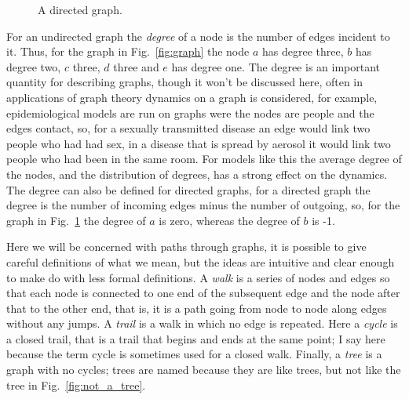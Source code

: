 \documentclass[11pt,a4paper]{scrartcl}
\begin{document}
\begin{figure}
\begin{center}
\end{center}
\caption{A directed graph. \label{fig:dir_graph}}
\end{figure}

For an undirected graph the \textsl{degree} of a node is the number of
edges incident to it. Thus, for the graph in Fig.~\ref{fig:graph} the
node $a$ has degree three, $b$ has degree two, $c$ three, $d$ three
and $e$ has degree one. The degree is an important quantity for
describing graphs, though it won't be discussed here, often in
applications of graph theory dynamics on a graph is considered, for
example, epidemiological models are run on graphs were the nodes are
people and the edges contact, so, for a sexually transmitted disease
an edge would link two people who had had sex, in a disease that is
spread by aerosol it would link two people who had been in the same
room. For models like this the average degree of the nodes, and the
distribution of degrees, has a strong effect on the dynamics. The
degree can also be defined for directed graphs, for a directed graph
the degree is the number of incoming edges minus the number of
outgoing, so, for the graph in Fig.~\ref{fig:dir_graph} the degree of
$a$ is zero, whereas the degree of $b$ is -1.



Here we will be concerned with paths through graphs, it is possible to
give careful definitions of what we mean, but the ideas are intuitive
and clear enough to make do with less formal definitions. A
\textsl{walk} is a series of nodes and edges so that each node is
connected to one end of the subsequent edge and the node after that to
the other end, that is, it is a path going from node to node along
edges without any jumps. A \textsl{trail} is a walk in which no edge
is repeated. Here a \textsl{cycle} is a closed trail, that is a trail
that begins and ends at the same point; I say here because the term
cycle is sometimes used for a closed walk. Finally, a \textsl{tree} is
a graph with no cycles; trees are named because they are like trees, but not like the tree in Fig.~\ref{fig:not_a_tree}.
\end{document}
